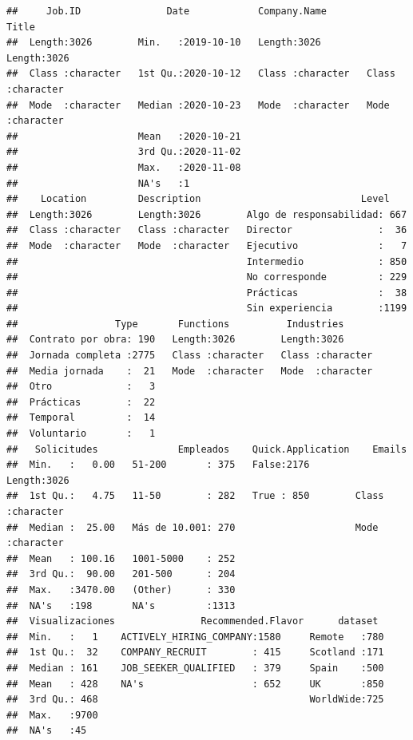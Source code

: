\documentclass[
]{article}
\begin{document}
\begin{verbatim}
##     Job.ID               Date            Company.Name          Title          
##  Length:3026        Min.   :2019-10-10   Length:3026        Length:3026       
##  Class :character   1st Qu.:2020-10-12   Class :character   Class :character  
##  Mode  :character   Median :2020-10-23   Mode  :character   Mode  :character  
##                     Mean   :2020-10-21                                        
##                     3rd Qu.:2020-11-02                                        
##                     Max.   :2020-11-08                                        
##                     NA's   :1                                                 
##    Location         Description                            Level     
##  Length:3026        Length:3026        Algo de responsabilidad: 667  
##  Class :character   Class :character   Director               :  36  
##  Mode  :character   Mode  :character   Ejecutivo              :   7  
##                                        Intermedio             : 850  
##                                        No corresponde         : 229  
##                                        Prácticas              :  38  
##                                        Sin experiencia        :1199  
##                 Type       Functions          Industries       
##  Contrato por obra: 190   Length:3026        Length:3026       
##  Jornada completa :2775   Class :character   Class :character  
##  Media jornada    :  21   Mode  :character   Mode  :character  
##  Otro             :   3                                        
##  Prácticas        :  22                                        
##  Temporal         :  14                                        
##  Voluntario       :   1                                        
##   Solicitudes              Empleados    Quick.Application    Emails         
##  Min.   :   0.00   51-200       : 375   False:2176        Length:3026       
##  1st Qu.:   4.75   11-50        : 282   True : 850        Class :character  
##  Median :  25.00   Más de 10.001: 270                     Mode  :character  
##  Mean   : 100.16   1001-5000    : 252                                       
##  3rd Qu.:  90.00   201-500      : 204                                       
##  Max.   :3470.00   (Other)      : 330                                       
##  NA's   :198       NA's         :1313                                       
##  Visualizaciones               Recommended.Flavor      dataset   
##  Min.   :   1    ACTIVELY_HIRING_COMPANY:1580     Remote   :780  
##  1st Qu.:  32    COMPANY_RECRUIT        : 415     Scotland :171  
##  Median : 161    JOB_SEEKER_QUALIFIED   : 379     Spain    :500  
##  Mean   : 428    NA's                   : 652     UK       :850  
##  3rd Qu.: 468                                     WorldWide:725  
##  Max.   :9700                                                    
##  NA's   :45
\end{verbatim}
\end{document}
